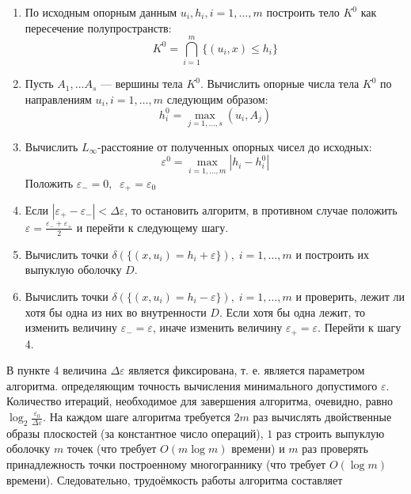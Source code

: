 \documentclass[a4paper, 10pt]{article}
\theoremstyle{definition}
\theoremstyle{plain}
\theoremstyle{plain}
\begin{document}
\begin{enumerate}
 \item По исходным опорным данным $u_{i}, h_{i}, i = 1, \ldots, m$
 построить тело $K^{0}$ как пересечение полупространств:
 \begin{equation*}
 \label{equation:naive-body}
  K^{0} = \bigcap \limits_{i = 1}^{m} \{(u_{i}, x) \leq h_{i}\}
 \end{equation*}
 \item Пусть $A_{1}, \ldots A_{s}$ --- вершины тела $K^{0}$. Вычислить опорные
 числа тела $K^{0}$ по направлениям $u_{i}, i = 1, \ldots, m$ следующим образом:
 \begin{equation*}
  h^{0}_{i} = \max \limits_{j = 1, \ldots, s} (u_{i}, A_{j})
 \end{equation*}
 \item Вычислить $L_{\infty}$-расстояние от полученных опорных чисел до
 исходных:
 \begin{equation*}
  \varepsilon^{0} = \max \limits_{i = 1, \ldots, m} |h_{i} - h^{0}_{i}|
 \end{equation*}
 Положить $\varepsilon_{-} = 0, \;\; \varepsilon_{+} = \varepsilon_{0}$
 \item Если $|\varepsilon_{+} - \varepsilon_{-}| < \Delta \varepsilon$, то
 остановить алгоритм, в противном случае положить
 $\varepsilon = \frac{\varepsilon_{-} + \varepsilon_{+}}{2}$ и перейти к
 следующему шагу.
 \item Вычислить точки
 $\delta(\{(x, u_{i}) = h_{i} + \varepsilon\}), \; i = 1, \ldots, m$ и построить
 их выпуклую оболочку $D$.
 \item Вычислить точки
 $\delta(\{(x, u_{i}) = h_{i} - \varepsilon\}), \; i = 1, \ldots, m$ и
 проверить, лежит ли хотя бы одна из них во внутренности $D$. Если хотя бы одна
 лежит, то изменить величину $\varepsilon_{-} = \varepsilon$, иначе изменить
 величину $\varepsilon_{+} = \varepsilon$. Перейти к шагу 4.
\end{enumerate}

В пункте 4 величина $\Delta \varepsilon$ является фиксирована, т. е. является
параметром алгоритма. определяющим точность вычисления минимального допустимого
$\varepsilon$. Количество итераций, необходимое для завершения алгоритма,
очевидно, равно $\log_{2} \frac{\varepsilon_{0}}{\Delta \varepsilon}$. На каждом
шаге алгоритма требуется $2m$ раз вычислять двойственные образы плоскостей (за
константное число операций), $1$ раз строить выпуклую оболочку $m$ точек
(что требует $O(m \log m)$ времени) и $m$ раз проверять принадлежность точки
построенному многограннику (что требует $O(\log m)$ времени). Следовательно,
трудоёмкость работы алгоритма составляет
\end{document}
